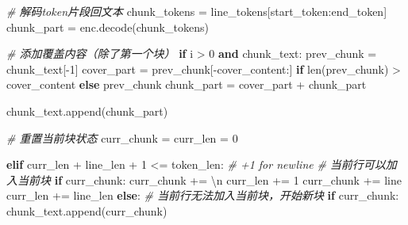 \documentclass[
]{article}
\newenvironment{Shaded}{}{}
\newcommand{\BuiltInTok}[1]{\textcolor[rgb]{0.00,0.50,0.00}{#1}}
\newcommand{\CharTok}[1]{\textcolor[rgb]{0.25,0.44,0.63}{#1}}
\newcommand{\CommentTok}[1]{\textcolor[rgb]{0.38,0.63,0.69}{\textit{#1}}}
\newcommand{\ControlFlowTok}[1]{\textcolor[rgb]{0.00,0.44,0.13}{\textbf{#1}}}
\newcommand{\DecValTok}[1]{\textcolor[rgb]{0.25,0.63,0.44}{#1}}
\newcommand{\KeywordTok}[1]{\textcolor[rgb]{0.00,0.44,0.13}{\textbf{#1}}}
\newcommand{\NormalTok}[1]{#1}
\newcommand{\OperatorTok}[1]{\textcolor[rgb]{0.40,0.40,0.40}{#1}}
\newcommand{\StringTok}[1]{\textcolor[rgb]{0.25,0.44,0.63}{#1}}
\begin{document}
\begin{Shaded}
\begin{Highlighting}[]
                \CommentTok{\# 解码token片段回文本}
\NormalTok{                chunk\_tokens }\OperatorTok{=}\NormalTok{ line\_tokens[start\_token:end\_token]}
\NormalTok{                chunk\_part }\OperatorTok{=}\NormalTok{ enc.decode(chunk\_tokens)}
                
                \CommentTok{\# 添加覆盖内容（除了第一个块）}
                \ControlFlowTok{if}\NormalTok{ i }\OperatorTok{\textgreater{}} \DecValTok{0} \KeywordTok{and}\NormalTok{ chunk\_text:}
\NormalTok{                    prev\_chunk }\OperatorTok{=}\NormalTok{ chunk\_text[}\OperatorTok{{-}}\DecValTok{1}\NormalTok{]}
\NormalTok{                    cover\_part }\OperatorTok{=}\NormalTok{ prev\_chunk[}\OperatorTok{{-}}\NormalTok{cover\_content:] }\ControlFlowTok{if} \BuiltInTok{len}\NormalTok{(prev\_chunk) }\OperatorTok{\textgreater{}}\NormalTok{ cover\_content }\ControlFlowTok{else}\NormalTok{ prev\_chunk}
\NormalTok{                    chunk\_part }\OperatorTok{=}\NormalTok{ cover\_part }\OperatorTok{+}\NormalTok{ chunk\_part}
                
\NormalTok{                chunk\_text.append(chunk\_part)}
            
            \CommentTok{\# 重置当前块状态}
\NormalTok{            curr\_chunk }\OperatorTok{=} \StringTok{\textquotesingle{}\textquotesingle{}}
\NormalTok{            curr\_len }\OperatorTok{=} \DecValTok{0}
            
        \ControlFlowTok{elif}\NormalTok{ curr\_len }\OperatorTok{+}\NormalTok{ line\_len }\OperatorTok{+} \DecValTok{1} \OperatorTok{\textless{}=}\NormalTok{ token\_len:  }\CommentTok{\# +1 for newline}
            \CommentTok{\# 当前行可以加入当前块}
            \ControlFlowTok{if}\NormalTok{ curr\_chunk:}
\NormalTok{                curr\_chunk }\OperatorTok{+=} \StringTok{\textquotesingle{}}\CharTok{\textbackslash{}n}\StringTok{\textquotesingle{}}
\NormalTok{                curr\_len }\OperatorTok{+=} \DecValTok{1}
\NormalTok{            curr\_chunk }\OperatorTok{+=}\NormalTok{ line}
\NormalTok{            curr\_len }\OperatorTok{+=}\NormalTok{ line\_len}
        \ControlFlowTok{else}\NormalTok{:}
            \CommentTok{\# 当前行无法加入当前块，开始新块}
            \ControlFlowTok{if}\NormalTok{ curr\_chunk:}
\NormalTok{                chunk\_text.append(curr\_chunk)}
            

\end{Highlighting}
\end{Shaded}
\end{document}
